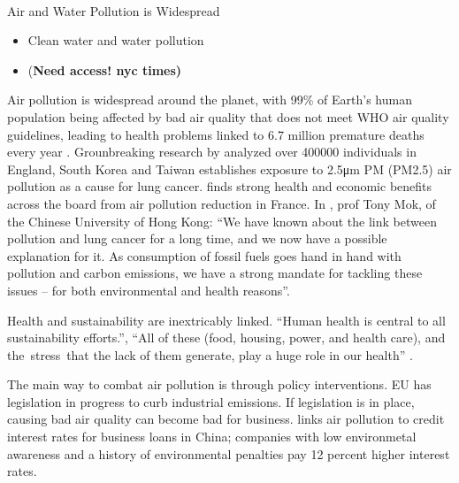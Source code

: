\documentclass[
  letterpaper,
  DIV=11,
  numbers=noendperiod]{scrartcl}
\makeatletter
\let\oldparagraph\paragraph
\renewcommand{\paragraph}{
    \@ifstar
      \xxxParagraphStar
      \xxxParagraphNoStar
  }
\newcommand{\xxxParagraphStar}[1]{\oldparagraph*{#1}\mbox{}}
\newcommand{\xxxParagraphNoStar}[1]{\oldparagraph{#1}\mbox{}}
\providecommand{\tightlist}{%
  \setlength{\itemsep}{0pt}\setlength{\parskip}{0pt}}\usepackage{longtable,booktabs,array}
\makeatother
\begin{document}
\paragraph{Air and Water Pollution is
Widespread}\label{air-and-water-pollution-is-widespread}

\begin{itemize}
\tightlist
\item
  Clean water and water pollution
\item
  \citet{kochOpinionArizonaRace2022} (\textbf{Need access! nyc times)}
\end{itemize}

Air pollution is widespread around the planet, with 99\% of Earth's
human population being affected by bad air quality that does not meet
WHO air quality guidelines, leading to health problems linked to 6.7
million premature deaths every year
\citet{worldhealthorganizationAmbientOutdoorAir2022}. Grounbreaking
research by \citet{lim1MOAirPollutioninduced2022} analyzed over 400000
individuals in England, South Korea and Taiwan establishes exposure to
2.5μm PM (PM2.5) air pollution as a cause for lung cancer.
\citet{bouscasseDesigningLocalAir2022} finds strong health and economic
benefits across the board from air pollution reduction in France. In
\citet{hannahdevlinCancerBreakthroughWakeup2022}, prof Tony Mok, of the
Chinese University of Hong Kong: ``We have known about the link between
pollution and lung cancer for a long time, and we now have a possible
explanation for it. As consumption of fossil fuels goes hand in hand
with pollution and carbon emissions, we have a strong mandate for
tackling these issues -- for both environmental and health reasons''.

Health and sustainability are inextricably linked. ``Human health is
central to all sustainability efforts.'', ``All of these (food, housing,
power, and health care), and the~stress~that the lack of them generate,
play a huge role in our health''
\citep{sarahludwigrauschSustainabilityYourHealth2021}.

The main way to combat air pollution is through policy interventions.
\citet{marialuisfernandesRealityCheckIndustrial2023} EU has legislation
in progress to curb industrial emissions. If legislation is in place,
causing bad air quality can become bad for business.
\citet{guHiddenCostsNongreen2023} links air pollution to credit interest
rates for business loans in China; companies with low environmetal
awareness and a history of environmental penalties pay 12 percent higher
interest rates.
\end{document}
